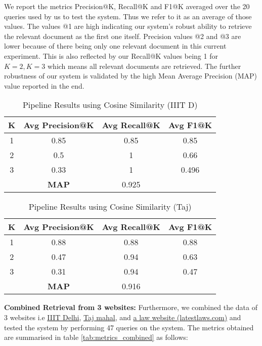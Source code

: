 \documentclass[sigconf,natbib=true,anonymous=false]{acmart}
\begin{document}
We report the metrics Precision@K, Recall@K and F1@K averaged over the 20 queries used by us to test the system. Thus we refer to it as an average of those values. The values @1 are high indicating our system's robust ability to retrieve the relevant document as the first one itself. Precision values @2 and @3 are lower because of there being only one relevant document in this current experiment. This is also reflected by our Recall@K values being 1 for $K=2, K=3$ which means all relevant documents are retrieved. The further robustness of our system is validated by the high Mean Average Precision (MAP) value reported in the end.

\begin{table}[h]
\centering
\begin{tabular}{cccc}
\hline
\textbf{K} & \textbf{Avg Precision@K} & \textbf{Avg Recall@K} & \textbf{ Avg F1@K} \\ \hline
1          & 0.85                 & 0.85              & 0.85          \\
2          & 0.5                  & 1                 & 0.66          \\
3          & 0.33                 & 1                 & 0.496         \\ 
\hline
&\textbf{MAP}        &0.925& \\
\hline
\end{tabular}
\caption{Pipeline Results using Cosine Similarity (IIIT D)}
\label{tab:metrics}
\end{table}

\begin{table}[h]
\centering
\begin{tabular}{cccc}
\hline
\textbf{K} & \textbf{Avg Precision@K} & \textbf{Avg Recall@K} & \textbf{ Avg F1@K} \\ \hline
1          & 0.88                & 0.88              & 0.88          \\
2          & 0.47                 & 0.94                 & 0.63          \\
3          & 0.31                 & 0.94              & 0.47         \\ 
\hline
&\textbf{MAP}        &0.916& \\
\hline
\end{tabular}
\caption{Pipeline Results using Cosine Similarity (Taj)}
\label{tab:metrics_taj}
\end{table}

\textbf{Combined Retrieval from 3 websites:} Furthermore, we combined the data of 3 websites i.e \href{www.iiitd.ac.in}{IIIT Delhi}, \href{www.tajmahal.gov.in}{Taj mahal}, and \href{www.latestlaws.com}{a law website (latestlaws.com)} and tested the system by performing 47 queries on the system. The metrics obtained are summarised in table \ref{tab:metrics_combined} as follows: 
\end{document}
